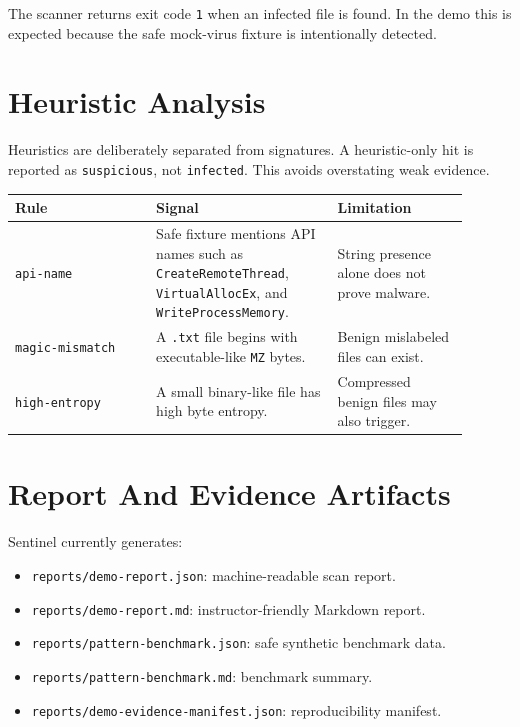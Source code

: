 \documentclass[11pt]{article}
\begin{document}
The scanner returns exit code \texttt{1} when an infected file is found. In the
demo this is expected because the safe mock-virus fixture is intentionally
detected.

\section{Heuristic Analysis}

Heuristics are deliberately separated from signatures. A heuristic-only hit is
reported as \texttt{suspicious}, not \texttt{infected}. This avoids overstating
weak evidence.

\begin{longtable}{p{0.28\linewidth}p{0.36\linewidth}p{0.26\linewidth}}
\toprule
\textbf{Rule} & \textbf{Signal} & \textbf{Limitation} \\
\midrule
\texttt{api-name} & Safe fixture mentions API names such as
\texttt{CreateRemoteThread}, \texttt{VirtualAllocEx}, and
\texttt{WriteProcessMemory}. & String presence alone does not prove malware. \\
\texttt{magic-mismatch} & A \texttt{.txt} file begins with
executable-like \texttt{MZ} bytes. & Benign mislabeled files can exist. \\
\texttt{high-entropy} & A small binary-like file has high byte
entropy. & Compressed benign files may also trigger. \\
\bottomrule
\end{longtable}

\section{Report And Evidence Artifacts}

Sentinel currently generates:

\begin{itemize}[leftmargin=*]
  \item \texttt{reports/demo-report.json}: machine-readable scan report.
  \item \texttt{reports/demo-report.md}: instructor-friendly Markdown report.
  \item \texttt{reports/pattern-benchmark.json}: safe synthetic benchmark data.
  \item \texttt{reports/pattern-benchmark.md}: benchmark summary.
  \item \texttt{reports/demo-evidence-manifest.json}: reproducibility manifest.
\end{itemize}
\end{document}
